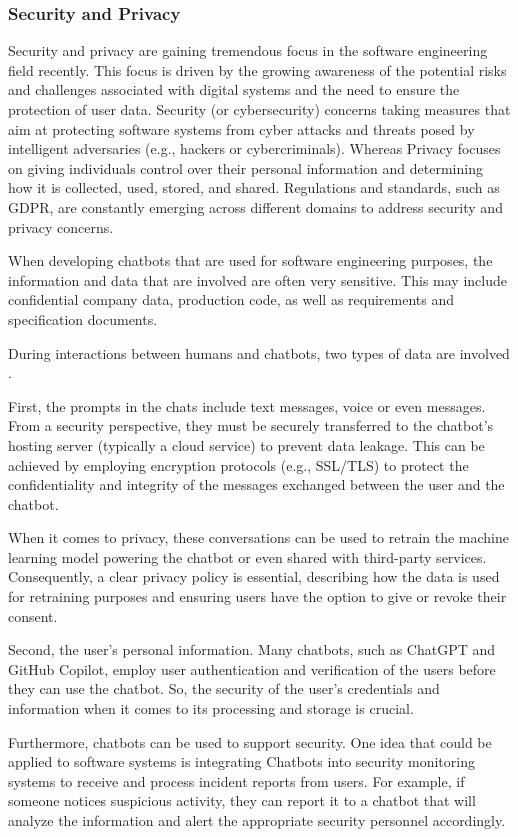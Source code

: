 \documentclass[10pt, a4paper]{article}
\begin{document}
\subsubsection{Security and Privacy}
Security and privacy are gaining tremendous focus in the software engineering field recently. This focus is driven by the growing awareness of the potential risks and challenges associated with digital systems and the need to ensure the protection of user data.
Security (or cybersecurity) concerns taking measures that aim at protecting software systems from cyber attacks and threats posed by intelligent adversaries (e.g., hackers or cybercriminals). Whereas Privacy focuses on giving individuals control over their personal information and determining how it is collected, used, stored, and shared.
Regulations and standards, such as GDPR, are constantly emerging across different domains to address security and privacy concerns.

When developing chatbots that are used for software engineering purposes, the information and data that are involved are often very sensitive. This may include confidential company data, production code, as well as requirements and specification documents.


During interactions between humans and chatbots, two types of data are involved \cite{hasal2021chatbots}. 

First, the prompts in the chats include text messages, voice or even messages. From a security perspective, they must be securely transferred to the chatbot's hosting server (typically a cloud service) to prevent data leakage. This can be achieved by employing encryption protocols (e.g., SSL/TLS) to protect the confidentiality and integrity of the messages exchanged between the user and the chatbot.

When it comes to privacy, these conversations can be used to retrain the machine learning model powering the chatbot or even shared with third-party services. Consequently, a clear privacy policy is essential, describing how the data is used for retraining purposes and ensuring users have the option to give or revoke their consent.

Second, the user's personal information. Many chatbots, such as ChatGPT and GitHub Copilot, employ user authentication and verification of the users before they can use the chatbot. So, the security of the user's credentials and information when it comes to its processing and storage is crucial.


Furthermore, chatbots can be used to support security. One idea that could be applied to software systems is integrating Chatbots into security monitoring systems to receive and process incident reports from users. For example, if someone notices suspicious activity, they can report it to a chatbot that will analyze the information and alert the appropriate security personnel accordingly.
\end{document}

